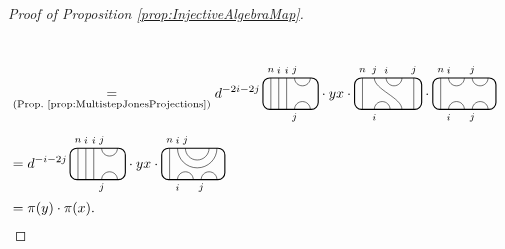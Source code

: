 \documentclass[11pt]{article}
\theoremstyle{plain}
\theoremstyle{definition}
\begin{document}
\begin{proof}[Proof of Proposition \ref{prop:InjectiveAlgebraMap}]
\begin{align*}
\begin{tikzpicture}[baseline=.3cm]
 \end{tikzpicture}
 \\&
 \underset{\text{(Prop.~\ref{prop:MultistepJonesProjections})}}{=}
 d^{-2i-2j}\,
 \begin{tikzpicture}[baseline=.3cm]
  \draw (.2,0) -- (.2,.8);
  \node at (.2,1) {\scriptsize{$n$}};
  \draw (.4,0) -- (.4,.8);
  \node at (.4,1) {\scriptsize{$i$}};
  \draw (.6,0) -- (.6,.8);
  \node at (.6,1) {\scriptsize{$i$}};
  \draw (.8,0) arc (180:0:.2cm);
  \node at (.8,-.2) {\scriptsize{$j$}};
  \draw (.8,.8) arc (-180:0:.2cm);
  \node at (.8,1) {\scriptsize{$j$}};
  \draw[thick, rounded corners = 5pt] (0,0) rectangle (1.4,.8);
 \end{tikzpicture}
\cdot yx \cdot 
\begin{tikzpicture}[baseline = .3cm]
 \draw[thick, rounded corners = 5pt] (0,0) rectangle (1.7,.8);
 \draw (.2,0) -- (.2,.8);
 \draw (.8,.8) arc (-180:0:.2cm);
 \draw (1.2,0) .. controls ++(90:.3cm) and ++(270:.3cm) .. (.5,.8);
 \draw (.5,0) arc (180:0:.2cm);
 \draw (1.5,0) -- (1.5,.8);
 \node at (.2,1) {\scriptsize{$n$}};
 \node at (.5,1) {\scriptsize{$j$}};
 \node at (.8,1) {\scriptsize{$i$}};
 \node at (.5,-.2) {\scriptsize{$i$}};
 \node at (1.5,1) {\scriptsize{$j$}};
\end{tikzpicture}
\cdot
 \begin{tikzpicture}[baseline=.3cm]
  \draw (.2,0) -- (.2,.8);
  \node at (.2,1) {\scriptsize{$n$}};
  \draw (.4,0) arc (180:0:.2cm);
  \node at (.4,-.2) {\scriptsize{$i$}};
  \draw (.4,.8) arc (-180:0:.2cm);
  \node at (.4,1) {\scriptsize{$i$}};
  \draw (1,0) arc (180:0:.2cm);
  \node at (1,-.2) {\scriptsize{$j$}};
  \draw (1,.8) arc (-180:0:.2cm);
  \node at (1,1) {\scriptsize{$j$}};
  \draw[thick, rounded corners = 5pt] (0,0) rectangle (1.6,.8);
 \end{tikzpicture} 
\\&=
 d^{-i-2j}\,
 \begin{tikzpicture}[baseline=.3cm]
  \draw (.2,0) -- (.2,.8);
  \node at (.2,1) {\scriptsize{$n$}};
  \draw (.4,0) -- (.4,.8);
  \node at (.4,1) {\scriptsize{$i$}};
  \draw (.6,0) -- (.6,.8);
  \node at (.6,1) {\scriptsize{$i$}};
  \draw (.8,0) arc (180:0:.2cm);
  \node at (.8,-.2) {\scriptsize{$j$}};
  \draw (.8,.8) arc (-180:0:.2cm);
  \node at (.8,1) {\scriptsize{$j$}};
  \draw[thick, rounded corners = 5pt] (0,0) rectangle (1.4,.8);
 \end{tikzpicture}
\cdot yx \cdot 
 \begin{tikzpicture}[baseline=.3cm]
  \draw (.2,0) -- (.2,.8);
  \node at (.2,1) {\scriptsize{$n$}};
  \draw (.4,0) arc (180:0:.2cm);
  \node at (.4,-.2) {\scriptsize{$i$}};
  \draw (1,0) arc (180:0:.2cm);
  \node at (1,-.2) {\scriptsize{$j$}};
  \draw (.4,.8) arc (-180:0:.5cm);
  \node at (.4,1) {\scriptsize{$i$}};
  \draw (.6,.8) arc (-180:0:.3cm);
  \node at (.6,1) {\scriptsize{$j$}};
  \draw[thick, rounded corners = 5pt] (0,0) rectangle (1.6,.8);
 \end{tikzpicture}
\\&=
\pi(y)\cdot \pi(x).
\end{align*}


\end{proof}
\end{document}
